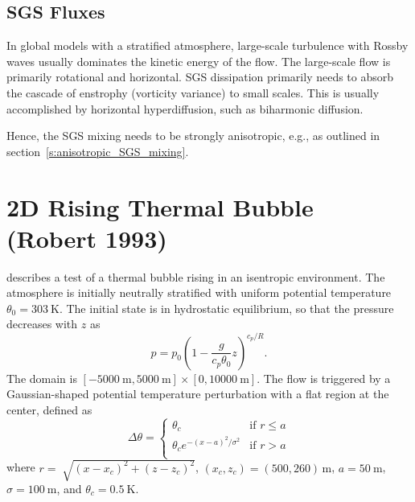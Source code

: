 \documentclass{report}
\begin{document}
\subsection{SGS Fluxes}

In global models with a stratified atmosphere, large-scale turbulence with Rossby waves usually dominates the kinetic energy of the flow. The large-scale flow is primarily rotational and horizontal. SGS dissipation primarily needs to absorb the cascade of enstrophy (vorticity variance) to small scales. This is usually accomplished by horizontal hyperdiffusion, such as biharmonic diffusion.

Hence, the SGS mixing needs to be strongly anisotropic, e.g., as outlined in section~\ref{s:anisotropic_SGS_mixing}.

\section{2D Rising Thermal Bubble (Robert 1993)}
\label{2dRTBtest}
\cite{robert1993} describes a test of a thermal bubble rising in an isentropic environment. The atmosphere is initially neutrally stratified with uniform potential temperature $\theta_0 = 303~\mathrm{K}$. The initial state is in hydrostatic equilibrium, so that the pressure decreases with $z$ as
\begin{equation}
\label{pressureDistrib}
p = p_{0}\left(1-\frac{g}{c_p{\theta_{0}}}z\right)^{c_p/R}.
\end{equation}
The domain is $[-5000~\mathrm{m},5000~\mathrm{m}]\times[0,10000~\mathrm{m}]$. The flow is triggered by a Gaussian-shaped potential temperature perturbation with a flat region at the center, defined as
\begin{equation}
 \Delta\theta = \left\{ \begin{array}{ll}
 \theta_c & \text{if } r \leq a\\
 \theta_c e^{-(x - a)^2/\sigma^2} & \text{if } r > a\\
\end{array} \right.
\label{eq:robertIni}
\end{equation}
where $r = \sqrt[]{(x-x_{c})^{2} + (z-z_{c})^{2}}$, $(x_c,z_c) = (500,260)\,\mathrm{m}$, $a=50~\mathrm{m}$, $\sigma = 100~\mathrm{m}$, and $\theta_c=0.5~\mathrm{K}$.
\end{document}
